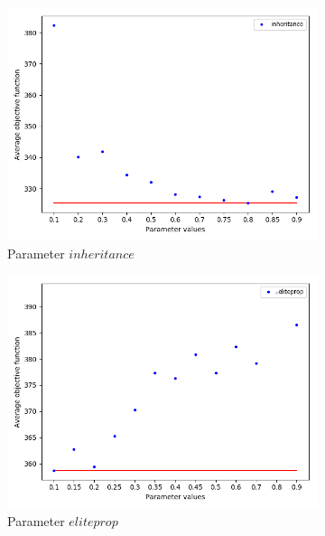 \begin{figure}
\begin{subfigure}[b]{.49\linewidth}
\includegraphics[width=\linewidth]{./img/best-inheritance.png}
\caption{Parameter $inheritance$ }\label{fig2c}
\end{subfigure}%
\begin{subfigure}[b]{.49\linewidth}
\centering
\includegraphics[width=\linewidth]{./img/best-eliteprop.png}
\caption{Parameter $eliteprop$ }\label{fig2d}
\end{subfigure}\vfill
\begin{subfigure}[b]{.49\linewidth}
\centering

\end{subfigure}
\end{figure}
